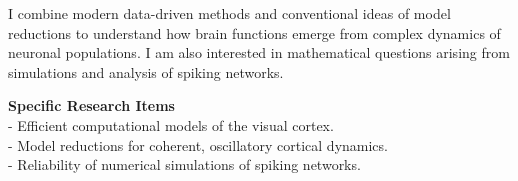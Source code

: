
I combine modern data-driven methods and conventional ideas of model reductions to understand how brain functions emerge from complex dynamics of neuronal populations. I am also interested in mathematical questions arising from simulations and analysis of spiking networks.

\vspace{0.25cm}
{\bf Specific Research Items} \\
- Efficient computational models of the visual cortex. \\
- Model reductions for coherent, oscillatory cortical dynamics.\\
- Reliability of numerical simulations of spiking networks.
